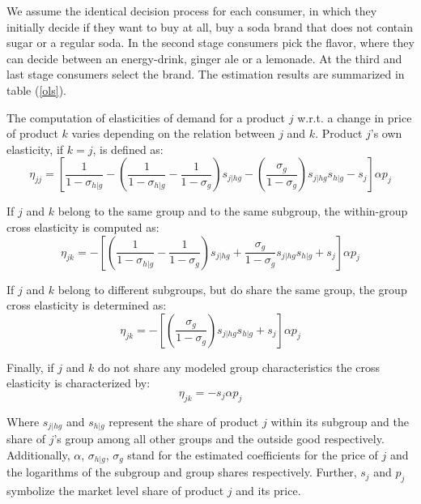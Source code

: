 \documentclass[12pt]{article}
\begin{document}
We assume the identical decision process for each consumer, in which they initially decide if they want to buy at all, buy a soda brand that does not contain sugar or a regular soda. In the second stage consumers pick the flavor, where they can decide between an energy-drink, ginger ale or a lemonade. At the third and last stage consumers select the brand. The estimation results are summarized in table (\ref{ols}).

The computation of elasticities of demand for a product $j$ w.r.t. a change in price of product $k$ varies depending on the relation between $j$ and $k$. Product $j$'s own elasticity, if $k=j$, is defined as:
\small
\begin{equation}
\label{own}
\eta_{jj} = \left[\frac{1}{1-\sigma_{h|g}} - \left(\frac{1}{1-\sigma_{h|g}} - \frac{1}{1-\sigma_g}\right)s_{j|hg}-\left(\frac{\sigma_g}{1-\sigma_g}\right)s_{j|hg}s_{h|g}-s_j\right]\alpha p_j
\end{equation}
\normalsize

If $j$ and $k$ belong to the same group and to the same subgroup, the within-group cross elasticity is computed as:
\small
\begin{equation}
\label{sub}
\eta_{jk} = -\left[\left(\frac{1}{1-\sigma_{h|g}}-\frac{1}{1-\sigma_g}\right)s_{j|hg} + \frac{\sigma_g}{1-\sigma_g}s_{j|hg}s_{h|g} + s_j \right] \alpha p_j
\end{equation}
\normalsize

If $j$ and $k$ belong to different subgroups, but do share the same group, the group cross elasticity is determined as:
\small
\begin{equation}
\label{group}
\eta_{jk} = - \left[ \left(\frac{\sigma_g}{1-\sigma_g}\right) s_{j|hg} s_{h|g} + s_j \right] \alpha p_j
\end{equation}
\normalsize

Finally, if $j$ and $k$ do not share any modeled group characteristics the cross elasticity is characterized by:
\begin{equation}
\label{other}
\eta_{jk} = -s_j \alpha p_j
\end{equation}

Where $s_{j|hg}$ and $s_{h|g}$ represent the share of product $j$ within its subgroup and the share of $j$'s group among all other groups and the outside good respectively. Additionally, $\alpha$, $\sigma_{h|g}$, $\sigma_g$ stand for the estimated coefficients for the price of $j$ and the logarithms of the subgroup and group shares respectively. Further, $s_j$ and $p_j$ symbolize the market level share of product $j$ and its price.
\end{document}
